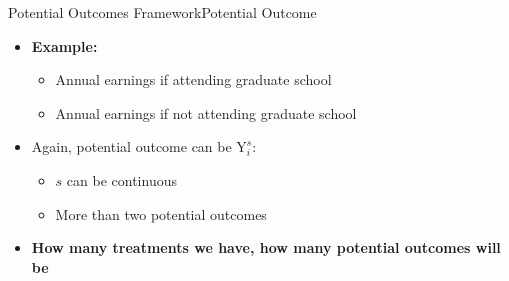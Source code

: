 \documentclass[hyperref={pdfpagelabels=false}]{beamer}
\begin{document}
\begin{frame}{Potential Outcomes Framework}{Potential Outcome}
\begin{itemize} 	
\item \textbf{Example:}
\vspace{0.2cm}
\begin{itemize} 
\item Annual earnings if attending graduate school
\vspace{0.2cm}
\item Annual earnings if not attending graduate school
\vspace{0.2cm}
\end{itemize}

\vspace{0.2cm}
\item Again, potential outcome can be $\mathrm{Y}^{s}_{i}$:
\begin{itemize}
	\vspace{0.2cm}
\item $s$ can be continuous	
	 \vspace{0.2cm}
\item More than two potential outcomes
\vspace{0.2cm}
\end{itemize}
\item \textbf{How many treatments we have, how many potential outcomes will be}

\end{itemize}

\end{frame}
\end{document}

